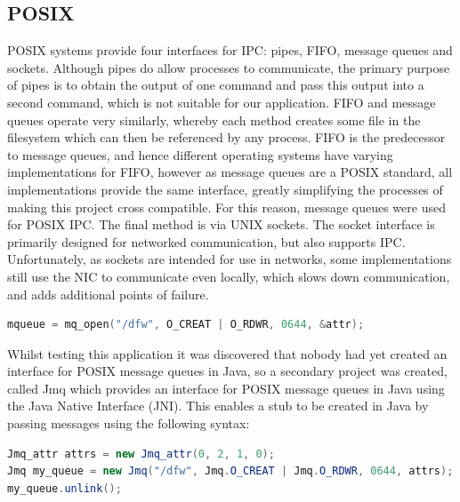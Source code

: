 \documentclass[a4paper, 11pt]{report}
\begin{document}
\subsection{POSIX} \label{posixipc}
\acrshort{POSIX} systems provide four interfaces for \acrshort{IPC}: pipes, FIFO, message queues and sockets. Although pipes do allow processes to communicate, the primary purpose of pipes is to obtain the output of one command and pass this output into a second command, which is not suitable for our application. FIFO and message queues operate very similarly, whereby each method creates some file in the filesystem which can then be referenced by any process. FIFO is the predecessor to message queues, and hence different operating systems have varying implementations for FIFO, however as message queues are a \acrshort{POSIX} standard, all implementations provide the same interface, greatly simplifying the processes of making this project cross compatible. For this reason, message queues were used for \acrshort{POSIX} \acrshort{IPC}. The final method is via UNIX sockets. The socket interface is primarily designed for networked communication, but also supports \acrshort{IPC}. Unfortunately, as sockets are intended for use in networks, some implementations still use the \acrshort{NIC} to communicate even locally, which slows down communication, and adds additional points of failure.

\begin{lstlisting}[language=c,style=c,caption=Creating the message queue on a POSIX OS]
mqueue = mq_open("/dfw", O_CREAT | O_RDWR, 0644, &attr);
\end{lstlisting}

Whilst testing this application it was discovered that nobody had yet created an interface for \acrshort{POSIX} message queues in Java, so a secondary project was created, called Jmq \cite{jmq} which provides an interface for \acrshort{POSIX} message queues in Java using the Java Native Interface (JNI). This enables a \gls{stub} to be created in Java by passing messages using the following syntax:\\

\begin{lstlisting}[language=java,style=java,caption=Example of Jmq]
Jmq_attr attrs = new Jmq_attr(0, 2, 1, 0);
Jmq my_queue = new Jmq("/dfw", Jmq.O_CREAT | Jmq.O_RDWR, 0644, attrs);
my_queue.unlink();
\end{lstlisting}
\end{document}
